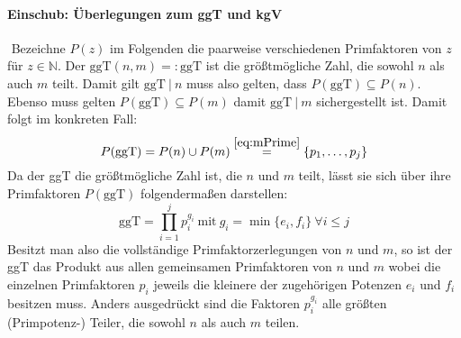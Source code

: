 \documentclass[DIN, pagenumber=false, fontsize=11pt, parskip=half]{scrartcl}
\newcommand{\N}[0]{\mathbb{N}}
\newcommand{\ggt}{\text{ggT}}
\begin{document}
\begin{enumerate}[label=\alph*)]
        \paragraph{Einschub: Überlegungen zum ggT und kgV} $ $ \newline
        Bezeichne $P(z)$ im Folgenden die paarweise verschiedenen Primfaktoren von $z$ für $z \in \N$. Der $\ggt(n,m) =: \ggt$ ist die größtmögliche Zahl, 
        die sowohl $n$ als auch $m$ teilt. Damit gilt $\ggt \ | \ n$ muss also gelten, dass $P(\ggt) \subseteq P(n)$. Ebenso muss gelten $P(\ggt) \subseteq P(m)$
        damit $\ggt \ | \ m$ sichergestellt ist. Damit folgt im konkreten Fall:
        \begin{equation}
            P(\ggt) = P(n) \cup P(m) \stackrel{\ref{eq:mPrime}}{=} \{p_1, \dots, p_j\} \label{eq:PggT}
        \end{equation}
        Da der ggT die größtmögliche Zahl ist, die $n$ und $m$ teilt, lässt sie sich über ihre Primfaktoren $P(\ggt)$ folgendermaßen darstellen:
        \begin{equation}
            \ggt = \prod_{i=1}^j{p_i^{g_i}} \ \text{mit} \ g_i = \min\{e_i, f_i\} \ \forall i \leq j \label{eq:ggt}
        \end{equation}
        Besitzt man also die vollständige Primfaktorzerlegungen von $n$ und $m$, so ist der ggT das Produkt aus allen gemeinsamen Primfaktoren von $n$ und $m$
        wobei die einzelnen Primfaktoren $p_i$ jeweils die kleinere der zugehörigen Potenzen $e_i$ und $f_i$ besitzen muss. Anders ausgedrückt sind die Faktoren
        $p_i^{g_i}$ alle größten (Primpotenz-) Teiler, die sowohl $n$ als auch $m$ teilen. \newpage


\end{enumerate}
\end{document}
